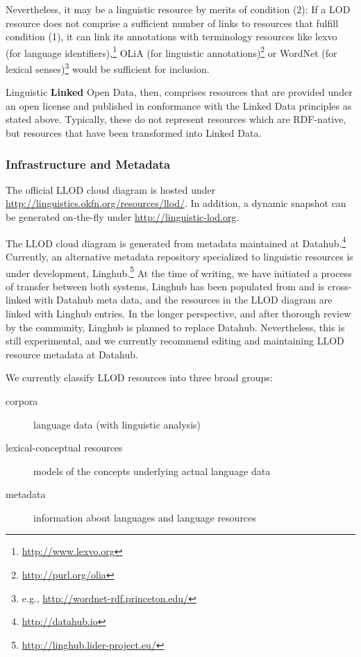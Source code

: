 Nevertheless, it may be a linguistic resource by merits of condition (2): 
If a LOD resource does not comprise a sufficient number of links to resources that fulfill condition (1), 
it can link its annotations with terminology resources like lexvo (for language identifiers),\footnote{
	\url{http://www.lexvo.org}
} OLiA (for linguistic annotations)\footnote{
	\url{http://purl.org/olia}
}
or WordNet (for lexical senses)\footnote{
	e.g., \url{http://wordnet-rdf.princeton.edu/}
} would be sufficient for inclusion.

Linguistic \textbf{Linked} Open Data, then, comprises resources that are provided under an open license and published in conformance with the Linked Data principles as stated above.
Typically, these do not represent resources which are RDF-native, but resources that have been transformed into Linked Data. 

\subsubsection{Infrastructure and Metadata}

The official LLOD cloud diagram is hosted under \url{http://linguistics.okfn.org/resources/llod/}. 
In addition, a dynamic snapshot can be generated on-the-fly under \url{http://linguistic-lod.org}.

The LLOD cloud diagram is generated from metadata maintained at Datahub.\footnote{
	\url{http://datahub.io}
}
Currently, an alternative metadata repository specialized to linguistic resources is under development, Linghub.\footnote{
	\url{http://linghub.lider-project.eu/}
}
At the time of writing, we have initiated a process of transfer between both systems, Linghub has been populated from and is cross-linked with Datahub meta data, 
and the resources in the LLOD diagram are linked with Linghub entries. 
In the longer perspective, and after thorough review by the community, Linghub is planned to replace Datahub.
Nevertheless, this is still experimental, and we currently recommend editing and maintaining LLOD resource metadata at Datahub.

We currently classify LLOD resources into three broad groups:

\begin{description}
\item[corpora] language data (with linguistic analysis)
\item[lexical-conceptual resources] models of the concepts underlying actual language data
\item[metadata] information about languages and language resources
\end{description}

